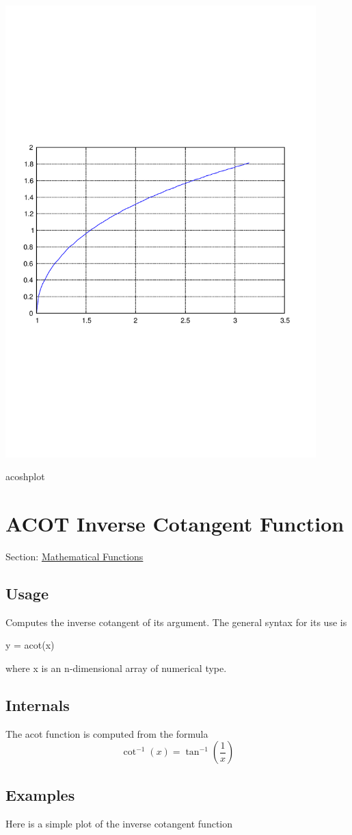  
\begin{DoxyImage}
\includegraphics[width=12cm]{acoshplot}
\caption{acoshplot}
\end{DoxyImage}
 \hypertarget{mathfunctions_acot}{}\section{A\-C\-O\-T Inverse Cotangent Function}\label{mathfunctions_acot}
Section\-: \hyperlink{sec_mathfunctions}{Mathematical Functions} \hypertarget{vtkwidgets_vtkxyplotwidget_Usage}{}\subsection{Usage}\label{vtkwidgets_vtkxyplotwidget_Usage}
Computes the inverse cotangent of its argument. The general syntax for its use is \begin{DoxyVerb}  y = acot(x)
\end{DoxyVerb}
 where {\ttfamily x} is an {\ttfamily n}-\/dimensional array of numerical type. \hypertarget{transforms_svd_Function}{}\subsection{Internals}\label{transforms_svd_Function}
The {\ttfamily acot} function is computed from the formula \[ \cot^{-1}(x) = \tan^{-1}\left(\frac{1}{x}\right) \] \hypertarget{variables_matrix_Examples}{}\subsection{Examples}\label{variables_matrix_Examples}
Here is a simple plot of the inverse cotangent function


